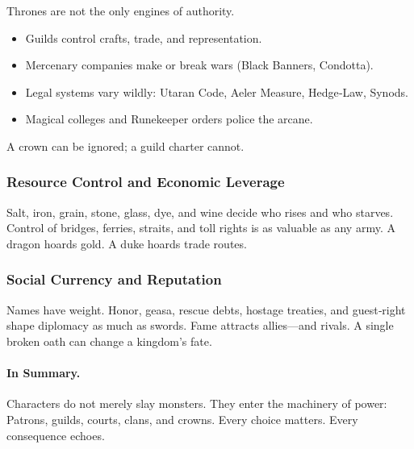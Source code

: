 Thrones are not the only engines of authority.
\begin{itemize}
    \item Guilds control crafts, trade, and representation.
    \item Mercenary companies make or break wars (Black Banners, Condotta).
    \item Legal systems vary wildly: Utaran Code, Aeler Measure, Hedge‑Law, Synods.
    \item Magical colleges and Runekeeper orders police the arcane.
\end{itemize}
A crown can be ignored; a guild charter cannot.

\subsubsection{Resource Control and Economic Leverage}

Salt, iron, grain, stone, glass, dye, and wine decide who rises and who starves. Control of bridges, ferries, straits, and toll rights is as valuable as any army. A dragon hoards gold. A duke hoards trade routes.

\subsubsection{Social Currency and Reputation}

Names have weight. Honor, geasa, rescue debts, hostage treaties, and guest‑right shape diplomacy as much as swords. Fame attracts allies---and rivals. A single broken oath can change a kingdom's fate.

\paragraph{In Summary.}
Characters do not merely slay monsters. They enter the machinery of power: Patrons, guilds, courts, clans, and crowns. Every choice matters. Every consequence echoes.

